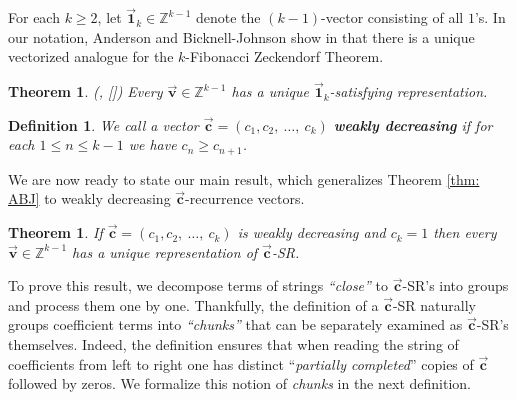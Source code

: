 \documentclass[]{interact}
\let\emph\relax %
\newcommand{\vtr}[1]{\vec{\mathbf{#1}}}
\theoremstyle{plain}
\numberwithin{equation}{section} %
\newtheorem{theorem}[thm]{Theorem}
\newtheorem{definition}[thm]{Definition}
\numberwithin{table}{section} %
\numberwithin{figure}{section}
\begin{document}
For each $k\geq 2$, let $\vtr{1}_k\in \mathbb{Z}^{k-1}$ denote the $(k-1)$-vector consisting of all $1$'s. In our notation, Anderson and Bicknell-Johnson show in \textcolor{blue}{\cite{ABJ11}} that there is a unique vectorized analogue for the $k$-Fibonacci Zeckendorf Theorem.

\begin{theorem}{\rm{(}\textcolor{blue}{\cite{ABJ11}\label{thm: ABJ}}, [\emph{Theorem 2}]\rm{)}}
Every $\vtr{v}\in \mathbb{Z}^{k-1}$ has a unique $\vtr{1}_k$-satisfying representation.  

\end{theorem}


\begin{definition}\label{Def: weakly dec}
    We call a vector $\vtr{c}=(c_1,c_2,\ \ldots,\ c_k)$  \textit{\textbf{weakly decreasing}} if for each $1\leq n\leq k-1$ we have $c_n\geq c_{n+1}$.
\end{definition}

We are now ready to state our main result, which generalizes Theorem \textcolor{blue}{\ref{thm: ABJ}} to weakly decreasing $\vtr{c}$-recurrence vectors.

\begin{theorem}\label{thm: main}
    If $\vtr{c}=(c_1,c_2,\ \ldots, \ c_k)$ is weakly decreasing and $c_k=1$ then every $\vtr{v}\in \mathbb{Z}^{k-1}$ has a unique representation of $\vtr{c}$-SR.
\end{theorem}

 To prove this result, we decompose terms of strings \textit{``close''} to $\vtr{c}$-SR's into groups and process them one by one. Thankfully, the definition of a $\vtr{c}$-SR naturally groups coefficient terms into \textit{``chunks''} that can be separately examined as $\vtr{c}$-SR's themselves. Indeed, the definition ensures that when reading the string of coefficients from left to right one has distinct ``\textit{partially completed}'' copies of $\vtr{c}$ followed by zeros. We formalize this notion of \textit{chunks} in the next definition.
\end{document}

